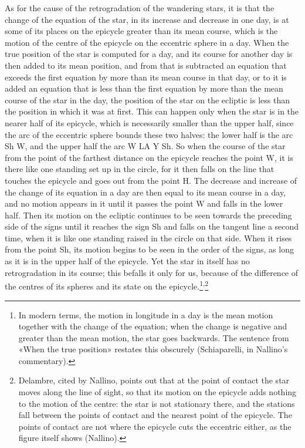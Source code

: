 \documentclass[11pt]{article}
\begin{document}
\par As for the cause of the retrogradation of the wandering stars, it is that the change of the equation of the star, in its increase and decrease in one day, is at some of its places on the epicycle greater than its mean course, which is the motion of the centre of the epicycle on the eccentric sphere in a day. When the true position of the star is computed for a day, and its course for another day is then added to its mean position, and from that is subtracted an equation that exceeds the first equation by more than its mean course in that day, or to it is added an equation that is less than the first equation by more than the mean course of the star in the day, the position of the star on the ecliptic is less than the position in which it was at first. This can happen only when the star is in the nearer half of its epicycle, which is necessarily smaller than the upper half, since the arc of the eccentric sphere bounds these two halves: the lower half is the arc Sh W, and the upper half the arc W LA Y Sh. So when the course of the star from the point of the farthest distance on the epicycle reaches the point W, it is there like one standing set up in the circle, for it then falls on the line that touches the epicycle and goes out from the point H. The decrease and increase of the change of its equation in a day are then equal to its mean course in a day, and no motion appears in it until it passes the point W and falls in the lower half. Then its motion on the ecliptic continues to be seen towards the preceding side of the signs until it reaches the sign Sh and falls on the tangent line a second time, when it is like one standing raised in the circle on that side. When it rises from the point Sh, its motion begins to be seen in the order of the signs, as long as it is in the upper half of the epicycle. Yet the star in itself has no retrogradation in its course; this befalls it only for us, because of the difference of the centres of its spheres and its state on the epicycle.\footnote{In modern terms, the motion in longitude in a day is the mean motion together with the change of the equation; when the change is negative and greater than the mean motion, the star goes backwards. The sentence from «When the true position» restates this obscurely (Schiaparelli, in Nallino's commentary).}\textsuperscript{,}\footnote{Delambre, cited by Nallino, points out that at the point of contact the star moves along the line of sight, so that its motion on the epicycle adds nothing to the motion of the centre: the star is not stationary there, and the stations fall between the points of contact and the nearest point of the epicycle. The points of contact are not where the epicycle cuts the eccentric either, as the figure itself shows (Nallino).}\par
\end{document}
